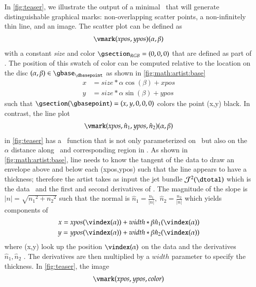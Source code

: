 \documentclass[journal]{vgtc}                %
\begin{document}
In \autoref{fig:teaser}, we illustrate the output of a minimal \vmark\ that will generate distinguishable graphical marks: non-overlapping scatter points, a non-infinitely thin line, and an image. The scatter plot can be defined as 
\begin{equation}
\vmark(xpos, ypos)(\alpha, \beta)
\label{eq:math:artist:q:scatter}
\end{equation}
with a constant \textit{size} and color $\gsection_{RGB} = (0,0,0)$ that are defined as part of \vmark. The position of this swatch of color can be computed relative to the location on the disc \((\alpha, \beta) \in \gbase_{\dbasepoint}\) as shown in \autoref{fig:math:artist:base}
\begin{align*}
x &= size *\alpha \cos(\beta) + xpos \\
y &= size *\alpha \sin(\beta) + ypos
\end{align*}
such that $\gsection(\gbasepoint) = (x, y, 0, 0, 0)$ colors the point (x,y) black. 
In contrast, the line plot 
\begin{equation}
\vmark(xpos, \hat{n}_{1}, ypos, \hat{n}_{2})(\alpha, \beta)
\label{eq:math:artist:q:line}
\end{equation}
in \autoref{fig:teaser} has a \vindex\ function that is not only parameterized on \dbasepoint\ but also on the $\alpha$ distance along \dbasepoint\ and corresponding region in \gbase. As shown in \autoref{fig:math:artist:base}, line needs to know the tangent of the data to draw an envelope above and below each (xpos,ypos) such that the line appears to have a thickness; therefore the artist takes as input the jet bundle \cite{JetBundle2020,musilovaCalculusVariationsJet2016} $\mathcal{J}^{2}(\dtotal)$ which is the data \dtotal\ and the first and second derivatives of \dtotal. The magnitude of the slope is $\lvert n \rvert = \sqrt{{n_{1}}^2 + {n_{2}}^2}$
such that the normal is  $\hat{n}_{1} = \frac{n_1}{\lvert n \rvert}, \; \hat{n}_{2} = \frac{n_2}{\lvert n \rvert}$ which yields components of \gsection\
\begin{align*}
 x = xpos(\vindex(\alpha)) &+ width*\beta\hat{n}_1(\vindex(\alpha)) \\
 y = ypos(\vindex(\alpha)) &+ width*\beta\hat{n}_2(\vindex(\alpha)) 
\end{align*}
where (x,y) look up the position $\vindex(\alpha)$ on the data and the derivatives $\hat{n}_1, \hat{n}_2$ . The derivatives are then multiplied by a $width$ parameter to specify the thickness.
In \autoref{fig:teaser}, the image 
\begin{equation}
\vmark(xpos, ypos, color)
\label{eq:math:artist:q:image}
\end{equation}
\end{document}
